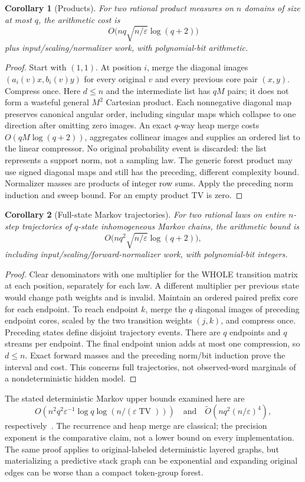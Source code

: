 \documentclass[11pt]{article}
\newtheorem{corollary}{Corollary}
\newcommand{\TV}{\operatorname{TV}}
\begin{document}
\begin{corollary}[Products]\label{cor:products}
For two rational product measures on $n$ domains of size at most $q$, the
arithmetic cost is
\[
 O\bigl(nq\sqrt{n/\varepsilon}\log(q+2)\bigr)
\]
plus input/scaling/normalizer work, with polynomial-bit arithmetic.
\end{corollary}
\begin{proof}
Start with $(1,1)$. At position $i$, merge the diagonal images
$(a_i(v)x,b_i(v)y)$ for every original $v$ and every previous core pair
$(x,y)$. Compress once. Here $d\leq n$ and the intermediate list has $qM$
pairs; it does not form a wasteful general $M^2$ Cartesian product.
Each nonnegative diagonal map preserves canonical angular order, including
singular maps which collapse to one direction after omitting zero images.
An exact $q$-way heap merge costs $O(qM\log(q+2))$, aggregates collinear
images and supplies an ordered list to the linear compressor. No original
probability event is discarded: the list represents a support norm, not a
sampling law. The generic forest product may use signed diagonal maps and
still has the preceding, different complexity bound.
Normalizer masses are products of integer row sums. Apply the preceding
norm induction and sweep bound. For an empty product TV is zero.
\end{proof}

\begin{corollary}[Full-state Markov trajectories]\label{cor:markov}
For two rational laws on entire $n$-step trajectories of $q$-state
inhomogeneous Markov chains, the arithmetic bound is
\[
 O\bigl(nq^2\sqrt{n/\varepsilon}\log(q+2)\bigr),
\]
including input/scaling/forward-normalizer work, with polynomial-bit integers.
\end{corollary}
\begin{proof}
Clear denominators with one multiplier for the WHOLE transition matrix at
each position, separately for each law. A different multiplier per previous
state would change path weights and is invalid. Maintain an ordered paired
prefix core for each endpoint. To reach endpoint $k$, merge the $q$ diagonal
images of preceding endpoint cores, scaled by the two transition weights
$(j,k)$, and compress once. Preceding states define disjoint trajectory events.
There are $q$ endpoints and $q$ streams per endpoint. The final endpoint union
adds at most one compression, so $d\leq n$. Exact forward masses and the
preceding norm/bit induction prove the interval and cost. This concerns full
trajectories, not observed-word marginals of a nondeterministic hidden model.
\end{proof}
The stated deterministic Markov upper bounds examined here are
\[
 O(n^2q^2\varepsilon^{-1}\log q\log(n/(\varepsilon\TV)))
 \quad\text{and}\quad
 \widetilde O(nq^2(n/\varepsilon)^4),
\]
respectively~\cite[Theorem 2]{feng}\cite[Corollary 1.5]{fu}.
The recurrence and heap merge are classical; the precision exponent is the
comparative claim, not a lower bound on every implementation.
The same proof applies to original-labeled deterministic layered graphs,
but materializing a predictive stack graph can be exponential and expanding
original edges can be worse than a compact token-group forest.
\end{document}

